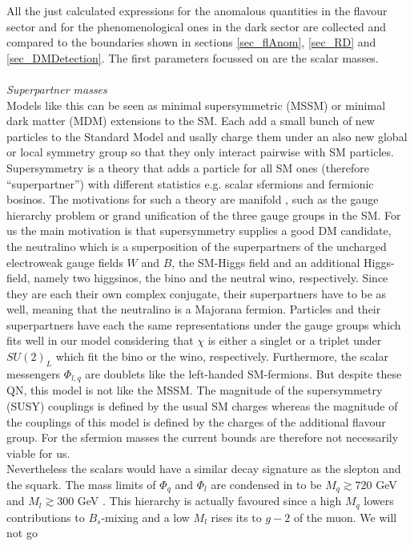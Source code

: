 All the just calculated expressions for the anomalous quantities in the flavour sector and for the phenomenological ones 
in the dark sector are collected and compared to the boundaries shown in sections \ref{sec_flAnom}, \ref{sec_RD} and \ref{sec_DMDetection}. The first
parameters focussed on are the scalar masses.
\\ \\ \textit{Superpartner masses}\\
Models like this can be seen as minimal supersymmetric (MSSM) or minimal dark matter (MDM) extensions to the SM. Each add a small bunch of new particles to 
the Standard Model and usally charge them under an also new global or local symmetry group so that they only interact pairwise with SM particles. 
Supersymmetry is a theory that adds a particle for all SM ones (therefore ``superpartner'') with different statistics 
\cite{9709356} e.g. scalar sfermions and fermionic bosinos. The motivations for such a theory are manifold 
\cite{1302.6587}, such as the gauge hierarchy problem or grand unification of the three gauge groups in the SM. 
For us the main motivation is that supersymmetry supplies a good DM
candidate, the neutralino which is a superposition of the superpartners of the uncharged electroweak gauge fields $W$ and $B$, the SM-Higgs field and 
an additional Higgs-field, namely two higgsinos, the bino and the neutral wino, respectively. Since they are each their own complex conjugate,
their superpartners have to be as well, meaning that the neutralino is a Majorana fermion. Particles and their superpartners have each the same 
representations under the gauge groups which fits well in our model considering that $\chi$ is either a singlet or a triplet under $SU(2)_L$ 
which fit the bino or the wino, respectively. Furthermore, the scalar messengers $\Phi_{l,q}$ are doublets like the left-handed SM-fermions. 
But despite these
QN, this model is not like the MSSM. The magnitude of the supersymmetry (SUSY) couplings is defined by the usual SM charges whereas the magnitude of 
the couplings of this model is 
defined by the charges of the additional flavour group. For the sfermion masses the current bounds are therefore not necessarily viable for us.\\
\noindent Nevertheless the scalars would have a similar decay signature as the slepton and the squark. The mass limits of $\Phi_q$
and $\Phi_l$ are condensed in \cite{Grip} to be $M_q \gtrsim 720$ GeV \cite{1506.08616} and $M_l \gtrsim 300$ GeV \cite{1403.5294}. This hierarchy is
actually favoured since a high $M_q$ lowers contributions to $B_s$-mixing and a low $M_l$ rises its to $g-2$ of the muon. We will not go 
